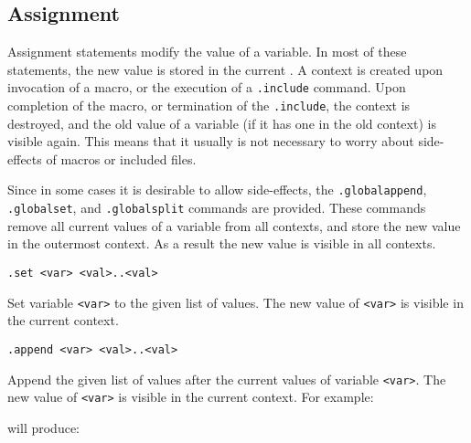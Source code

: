 \subsection{Assignment}
\label{s.assignment}
Assignment statements modify the value of a variable. In most of these
statements, the new value is stored in the current .
A context is created upon invocation of a macro, or the execution of a
\verb'.include' command. Upon completion of the macro, or termination
of the \verb'.include', the context is destroyed, and the old value of
a variable (if it has one in the old context) is visible again.
This means that it usually is not necessary to worry about side-effects
of macros or included files.

Since in some cases it is desirable to allow side-effects, the
\verb'.globalappend', \verb'.globalset', and \verb'.globalsplit'
commands are provided.  These commands remove all current values
of a variable from all contexts, and store the new value in the
outermost context. As a result the new value is visible in all
contexts.
\begin{verbatim}
.set <var> <val>..<val>
\end{verbatim}
\begin{desc}
Set variable \texttt{<var>} to the given list of values.
The new value of \texttt{<var>} is visible in the current context.
\end{desc}
\begin{verbatim}
.append <var> <val>..<val>
\end{verbatim}
\begin{desc}
Append the given list of values after the current values of variable
\texttt{<var>}.
The new value of \texttt{<var>} is visible in the current context.
For example:
\begin{showfile}

\end{showfile}
will produce:
\begin{showfile}

\end{showfile}
\end{desc}

